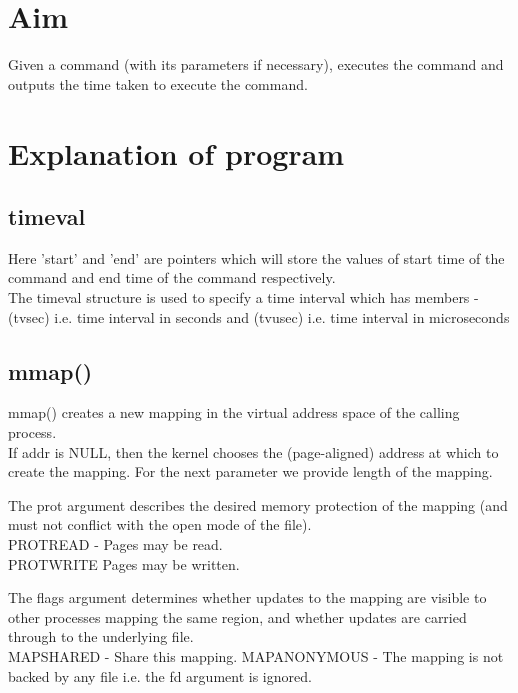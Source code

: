 \documentclass[12pt]{article}
\begin{document}
\maketitle

\section{Aim}
Given a command (with its parameters if necessary), executes the command and outputs the time taken to execute the command.

\section{Explanation of program}

\subsection{timeval}

Here 'start' and 'end' are pointers which will store the values of start time of the command and end time of the command respectively. \\
The timeval structure is used to specify a time interval which has members - (tv\textunderscore sec) i.e. time interval in seconds and (tv\textunderscore usec) i.e. time interval in microseconds \\
\subsection{mmap()}
mmap() creates a new mapping in the virtual address space of the calling process. \\

If addr is NULL, then the kernel chooses the (page-aligned) address at which to create the mapping. For the next parameter we provide length of the mapping.

The prot argument describes the desired memory protection of the mapping (and must not conflict with the open mode of the file).\\
PROT\textunderscore READ -  Pages may be read.\\
PROT\textunderscore WRITE Pages may be written.

The flags argument determines whether updates to the mapping are visible to other processes mapping the same region, and whether updates are carried through to the underlying file.\\
MAP\textunderscore SHARED - Share this mapping.
MAP\textunderscore ANONYMOUS - The mapping is not backed by any file i.e. the fd argument is ignored.
\end{document}
